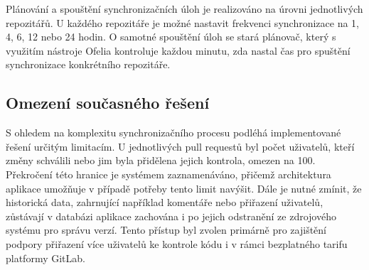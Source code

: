 Plánování a spouštění synchronizačních úloh je realizováno na úrovni jednotlivých repozitářů. U každého repozitáře je možné nastavit frekvenci synchronizace na 1, 4, 6, 12 nebo 24 hodin. O samotné spouštění úloh se stará plánovač, který s využitím nástroje Ofelia kontroluje každou minutu, zda nastal čas pro spuštění synchronizace konkrétního repozitáře.

\subsection{Omezení současného řešení}
S ohledem na komplexitu synchronizačního procesu podléhá implementované řešení určitým limitacím. U jednotlivých pull requestů byl počet uživatelů, kteří změny schválili nebo jim byla přidělena jejich kontrola, omezen na 100. Překročení této hranice je systémem zaznamenáváno, přičemž architektura aplikace umožňuje v případě potřeby tento limit navýšit. Dále je nutné zmínit, že historická data, zahrnující například komentáře nebo přiřazení uživatelů, zůstávají v databázi aplikace zachována i po jejich odstranění ze zdrojového systému pro správu verzí. Tento přístup byl zvolen primárně pro zajištění podpory přiřazení více uživatelů ke kontrole kódu i v rámci bezplatného tarifu platformy GitLab.
